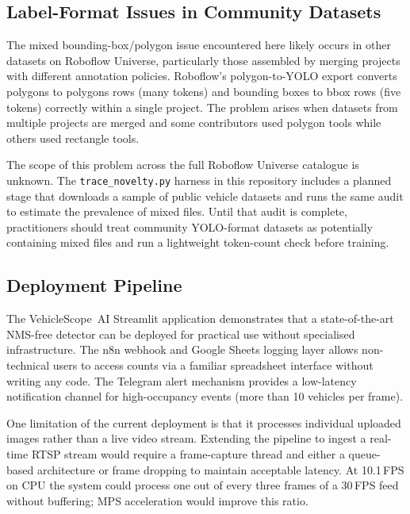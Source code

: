 \subsection{Label-Format Issues in Community Datasets}
\label{sec:disc-label}

The mixed bounding-box/polygon issue encountered here likely occurs in
other datasets on Roboflow Universe, particularly those assembled by
merging projects with different annotation policies.
Roboflow's polygon-to-YOLO export converts polygons to polygons rows
(many tokens) and bounding boxes to bbox rows (five tokens) correctly
within a single project.
The problem arises when datasets from multiple projects are merged and
some contributors used polygon tools while others used rectangle tools.

The scope of this problem across the full Roboflow Universe catalogue is
unknown.
The \texttt{trace\_novelty.py} harness in this repository includes a
planned stage that downloads a sample of public vehicle datasets and
runs the same audit to estimate the prevalence of mixed files.
Until that audit is complete, practitioners should treat community
YOLO-format datasets as potentially containing mixed files and run
a lightweight token-count check before training.

\subsection{Deployment Pipeline}
\label{sec:disc-deploy}

The VehicleScope~AI Streamlit application demonstrates that a
state-of-the-art NMS-free detector can be deployed for practical use
without specialised infrastructure.
The n8n webhook and Google Sheets logging layer allows non-technical
users to access counts via a familiar spreadsheet interface without
writing any code.
The Telegram alert mechanism provides a low-latency notification channel
for high-occupancy events (more than 10 vehicles per frame).

One limitation of the current deployment is that it processes individual
uploaded images rather than a live video stream.
Extending the pipeline to ingest a real-time RTSP stream would require a
frame-capture thread and either a queue-based architecture or frame
dropping to maintain acceptable latency.
At 10.1\,FPS on CPU the system could process one out of every three
frames of a 30\,FPS feed without buffering; MPS acceleration would
improve this ratio.

